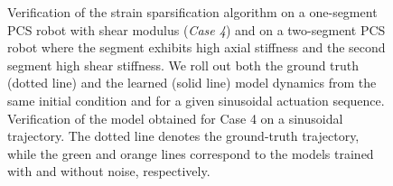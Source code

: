 \begin{figure}[ht]

    \caption{Verification of the strain sparsification algorithm on a one-segment \gls{PCS} robot with shear modulus (\emph{Case 4}) and on a two-segment \gls{PCS} robot where the  segment exhibits high axial stiffness and the second segment high shear stiffness. We roll out both the ground truth (dotted line) and the learned (solid line) model dynamics from the same initial condition and for a given sinusoidal actuation sequence.  Verification of the model obtained for Case 4 on a sinusoidal trajectory. The dotted line denotes the ground-truth trajectory, while the green and orange lines correspond to the models trained with and without noise, respectively.
    }
    \label{fig:pcsregression:results:strain_sparsification}
\end{figure}


